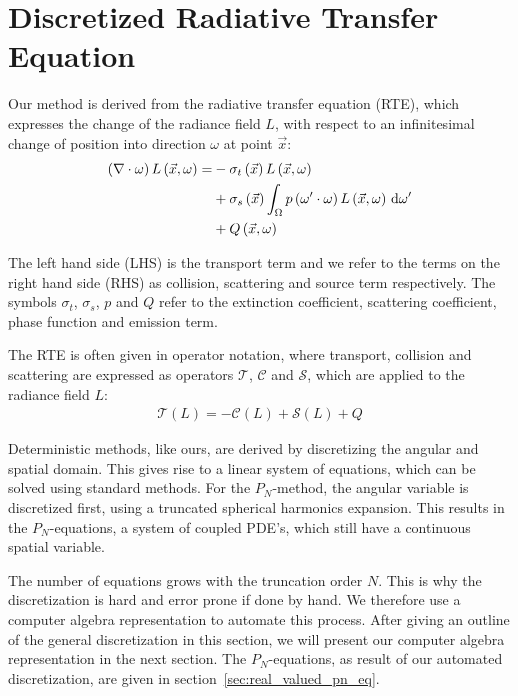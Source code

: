 \section{Discretized Radiative Transfer Equation}
\label{sec:discretized_rte}

Our method is derived from the radiative transfer equation (RTE), which expresses the change of the radiance field $L$, with respect to an infinitesimal change of position into direction $\omega$ at point $\vec{x}$:
\begin{align}
\left(\nabla\cdot\omega\right)L\left(\vec{x}, \omega \right)
=&
-\sigma_t\left(\vec{x}\right) L\left(\vec{x}, \omega \right)\nonumber\\
&
+\sigma_s\left(\vec{x}\right) \int_{\Omega}
{
p\left(\omega'\cdot\omega\right)L\left(\vec{x}, \omega \right)\,\mathrm{d}\omega'
}\nonumber\\
&
+Q\left(\vec{x}, \omega\right)\nonumber
\label{eq:rte}
\end{align}

The left hand side (LHS) is the transport term and we refer to the terms on the right hand side (RHS) as collision, scattering and source term respectively. The symbols $\sigma_t$, $\sigma_s$, $p$ and $Q$ refer to the extinction coefficient, scattering coefficient, phase function and emission term.

The RTE is often given in operator notation, where transport, collision and scattering are expressed as operators $\mathcal{T}$, $\mathcal{C}$ and $\mathcal{S}$, which are applied to the radiance field $L$:
\begin{align}
\mathcal{T}\left(L\right) = -\mathcal{C}\left(L\right) + \mathcal{S}\left(L\right) + Q
\end{align}

Deterministic methods, like ours, are derived by discretizing the angular and spatial domain. This gives rise to a linear system of equations, which can be solved using standard methods. For the $P_N$-method, the angular variable is discretized first, using a truncated spherical harmonics expansion. This results in the $P_N$-equations, a system of coupled PDE's, which still have a continuous spatial variable.

The number of equations grows with the truncation order $N$. This is why the discretization is hard and error prone if done by hand. We therefore use a computer algebra representation to automate this process. After giving an outline of the general discretization in this section, we will present our computer algebra representation in the next section. The $P_N$-equations, as result of our automated discretization, are given in section~\ref{sec:real_valued_pn_eq}. 

